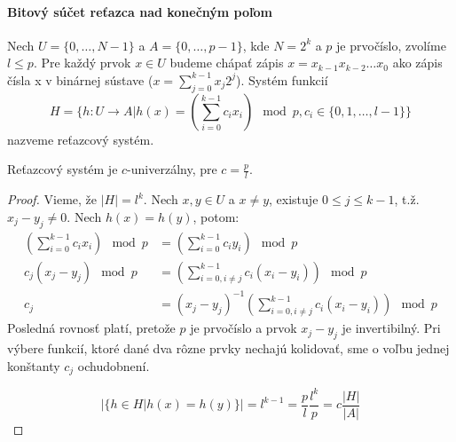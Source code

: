 \paragraph{Bitový súčet reťazca nad konečným poľom}
\begin{definition}
Nech $U = \{0, \dots, N - 1\}$ a $A = \{0, \dots, p - 1 \}$, kde $N = 2^k$ a $p$ je prvočíslo, zvolíme $l \leq p$. Pre každý prvok $x \in U$ budeme chápať zápis $x = x_{k - 1} x_{k-2} \dots x_0$ ako zápis čísla x v binárnej sústave ($x = \displaystyle \sum_{j=0}^{k-1} x_j 2^j$). Systém funkcií 
\begin{displaymath}
H = \{ h: U \rightarrow A | h(x) = (\displaystyle \sum_{i=0}^{k-1} c_i x_i) \mod p, c_i \in \{0, 1, \dots, l - 1\} \}
\end{displaymath} 
nazveme reťazcový systém.
\end{definition}
\begin{remark}
Reťazcový systém je $c$-univerzálny, pre $c = \frac{p}{l}$.
\end{remark}
\begin{proof}
Vieme, že $|H| = l^k$. Nech $x, y \in U$ a $x \neq y$, existuje $0 \leq j \leq k-1$, t.ž. $x_j - y_j \neq 0$.
Nech $h(x) = h(y)$, potom:
\begin{displaymath}
\begin{split}
\left(\displaystyle \sum_{i=0}^{k-1} c_i x_i\right) \mod p & = \left(\displaystyle \sum_{i=0}^{k-1} c_i y_i\right) \mod p \\
c_j(x_j - y_j) \mod p & = \left(\displaystyle \sum_{i=0, i \neq j}^{k-1} c_i (x_i - y_i)\right) \mod p \\
c_j & = (x_j - y_j) ^ {-1}\left(\displaystyle \sum_{i=0, i \neq j}^{k-1} c_i (x_i - y_i)\right) \mod p
\end{split}
\end{displaymath}
Posledná rovnosť platí, pretože $p$ je prvočíslo a prvok $x_j - y_j$ je invertibilný. Pri výbere funkcií, ktoré dané dva rôzne prvky nechajú kolidovať, sme o voľbu jednej konštanty $c_j$ ochudobnení. 

\begin{displaymath}
|\{h \in H | h(x) = h(y) \}| = l^{k-1} = \frac{p}{l}\frac{l^k}{p} = c\frac{|H|}{|A|}
\end{displaymath}
\end{proof}

